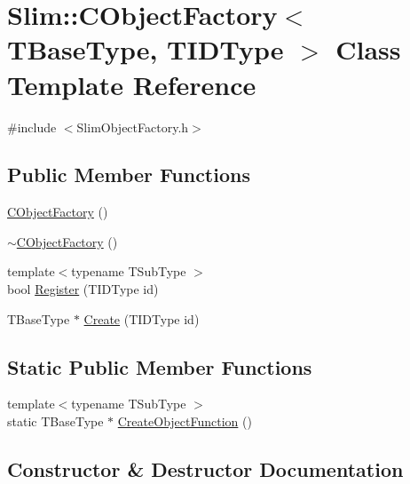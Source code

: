\hypertarget{class_slim_1_1_c_object_factory}{}\section{Slim\+:\+:C\+Object\+Factory$<$ T\+Base\+Type, T\+I\+D\+Type $>$ Class Template Reference}
\label{class_slim_1_1_c_object_factory}


{\ttfamily \#include $<$Slim\+Object\+Factory.\+h$>$}

\subsection*{Public Member Functions}
\begin{DoxyCompactItemize}
\item 
\hyperlink{class_slim_1_1_c_object_factory_a04d2b19d8b421acd2b0e2d6a41f88d53}{C\+Object\+Factory} ()
\item 
\hyperlink{class_slim_1_1_c_object_factory_a26de9e5950158d5c7ec119e34140f28f}{$\sim$\+C\+Object\+Factory} ()
\item 
{\footnotesize template$<$typename T\+Sub\+Type $>$ }\\bool \hyperlink{class_slim_1_1_c_object_factory_ae26a66c9011e4b0e276fab1df0b8df17}{Register} (T\+I\+D\+Type id)
\item 
T\+Base\+Type $\ast$ \hyperlink{class_slim_1_1_c_object_factory_aa7cbd3fcb81ae25f64de76b5f926df74}{Create} (T\+I\+D\+Type id)
\end{DoxyCompactItemize}
\subsection*{Static Public Member Functions}
\begin{DoxyCompactItemize}
\item 
{\footnotesize template$<$typename T\+Sub\+Type $>$ }\\static T\+Base\+Type $\ast$ \hyperlink{class_slim_1_1_c_object_factory_a9c030922f5430096a09a41ad8882c465}{Create\+Object\+Function} ()
\end{DoxyCompactItemize}


\subsection{Constructor \& Destructor Documentation}
\hypertarget{class_slim_1_1_c_object_factory_a04d2b19d8b421acd2b0e2d6a41f88d53}{}
